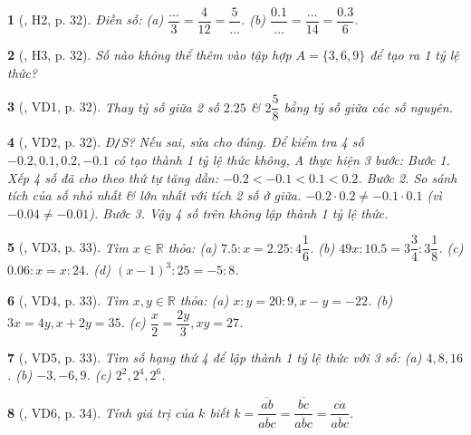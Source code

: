 \documentclass{article}
\newtheorem{baitoan}{}
\begin{document}
\begin{baitoan}[\cite{Binh_boi_duong_Toan_7_tap_1}, H2, p. 32]
	Điền số: (a) $\dfrac{\ldots}{3} = \dfrac{4}{12} = \dfrac{5}{\ldots}$. (b) $\dfrac{0.1}{\ldots} = \dfrac{\ldots}{14} = \dfrac{0.3}{6}$.
\end{baitoan}

\begin{baitoan}[\cite{Binh_boi_duong_Toan_7_tap_1}, H3, p. 32]
	Số nào không thể thêm vào tập hợp $A = \{3,6,9\}$ để tạo ra 1 tỷ lệ thức?
\end{baitoan}

\begin{baitoan}[\cite{Binh_boi_duong_Toan_7_tap_1}, VD1, p. 32]
	Thay tỷ số giữa 2 số $2.25$ \& $2\dfrac{5}{8}$ bằng tỷ số giữa các số nguyên.
\end{baitoan}

\begin{baitoan}[\cite{Binh_boi_duong_Toan_7_tap_1}, VD2, p. 32]
	{\rm Đ{\tt/}S?} Nếu sai, sửa cho đúng. Để kiểm tra 4 số $-0.2,0.1,0.2,-0.1$ có tạo thành 1 tỷ lệ thức không, A thực hiện 3 bước: Bước 1. Xếp 4 số đã cho theo thứ tự tăng dần: $-0.2 < -0.1 < 0.1 < 0.2$. Bước 2. So sánh tích của số nhỏ nhất \& lớn nhất với tích 2 số ở giữa. $-0.2\cdot0.2\ne-0.1\cdot0.1$ (vì $-0.04\ne-0.01$). Bước 3. Vậy 4 số trên không lập thành 1 tỷ lệ thức.
\end{baitoan}

\begin{baitoan}[\cite{Binh_boi_duong_Toan_7_tap_1}, VD3, p. 33]
	Tìm $x\in\mathbb{R}$ thỏa: (a) $7.5:x = 2.25:4\dfrac{1}{6}$. (b) $49x:10.5 = 3\dfrac{3}{4}:3\dfrac{1}{8}$. (c) $0.06:x = x:24$. (d) $(x - 1)^3:25 = -5:8$.
\end{baitoan}

\begin{baitoan}[\cite{Binh_boi_duong_Toan_7_tap_1}, VD4, p. 33]
	Tìm $x,y\in\mathbb{R}$ thỏa: (a) $x:y = 20:9,x - y = -22$. (b) $3x = 4y,x + 2y = 35$. (c) $\dfrac{x}{2} = \dfrac{2y}{3},xy = 27$.
\end{baitoan}

\begin{baitoan}[\cite{Binh_boi_duong_Toan_7_tap_1}, VD5, p. 33]
	Tìm số hạng thứ 4 để lập thành 1 tỷ lệ thức với 3 số: (a) $4,8,16$. (b) $-3,-6,9$. (c) $2^2,2^4,2^6$.
\end{baitoan}

\begin{baitoan}[\cite{Binh_boi_duong_Toan_7_tap_1}, VD6, p. 34]
	Tính giá trị của $k$ biết $k = \dfrac{\overline{ab}}{\overline{abc}} = \dfrac{\overline{bc}}{\overline{abc}} = \dfrac{\overline{ca}}{\overline{abc}}$.
\end{baitoan}
\end{document}
